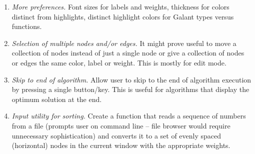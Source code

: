 \begin{enumerate}
\item \emph{More preferences.} Font sizes for labels and weights, thickness for colors
  distinct from highlights, distinct highlight colors for Galant types versus functions.

\item \emph{Selection of multiple nodes and/or edges.}  It might prove useful
  to move a collection of nodes instead of just a single node or give a
  collection of nodes or edges the same color, label or weight. This is
  mostly for edit mode.

\item \emph{Skip to end of algorithm.} Allow user to skip to the end of
  algorithm execution by pressing a single button/key. This is
  useful for algorithms that display the optimum solution at the end.

\item \emph{Input utility for sorting.} Create a function that reads a
  sequence of numbers from a file (prompts user on command line -- file
  browser would require unnecessary sophistication) and converts it to a set
  of evenly spaced (horizontal) nodes in the current window with the
  appropriate weights.
  
\end{enumerate}

